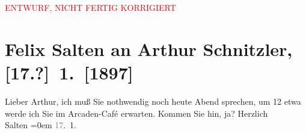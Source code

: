 
\begin{center}
            \textcolor{red}{ENTWURF, NICHT FERTIG KORRIGIERT}
                      \end{center}
            
         \renewcommand{\erwaehnteOrte}{Orte: Café Arkaden, Wien}
         \renewcommand{\erwaehnteWerke}{}
               \section[Felix Salten an Arthur Schnitzler, {[}17.?{]} 1. {[}1897{]}]{ Felix Salten an Arthur Schnitzler, {[}17.?{]} 1. {[}1897{]}}\nopagebreak{}\rehead{ }\begin{ledgroupsized}[t]{13cm}\normalsize\beginnumbering \toendnotes[C]{\smallbreak\pagebreak[2]} 
\pstart
           \noindent{}{\pb}Lieber Arthur, ich muß Sie nothwendig noch heute Abend sprechen, um
               12 etwa werde ich Sie im Arcaden-Café
               erwarten. Kommen Sie hin, ja?\pend
           \pstart
           Herzlich {\\[\baselineskip]}\spacefill\mbox{Salten}\pend
           \leftskip=0em{}\pstart
           \textcolor{gray}{17}. 1.\pend
           
         
         \endnumbering{}\end{ledgroupsized}\begin{anhang}\end{anhang}\newcommand{\dateiname}{L03262}\newcommand{\titel}{Felix Salten an Arthur Schnitzler, [17.?] 1. [1897]}\newcommand{\editorInnen}{Martin Anton Müller und Laura Untner}
      